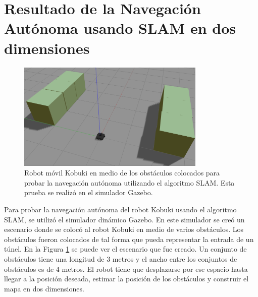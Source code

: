 \section{Resultado de la Navegación Autónoma usando SLAM en dos dimensiones}
\begin{figure}%
  \centering \footnotesize
  \includegraphics[width=0.80\textwidth]{images/kbki_ambient.png}
  \captionsetup{font=footnotesize}
  \caption{Robot móvil Kobuki en medio de los obstáculos colocados para probar la 
  navegación autónoma utilizando el algoritmo SLAM. Esta prueba se realizó en el
  simulador Gazebo.}
  \label{fig:Gazebo_simu}
\end{figure}
Para probar la navegación autónoma del robot Kobuki usando el algoritmo SLAM, se utilizó
el simulador dinámico Gazebo. En este simulador se creó un escenario donde se colocó al 
robot Kobuki en medio de varios obstáculos. Los obstáculos fueron colocados de tal forma
que pueda representar la entrada de un túnel. En la Figura \ref{fig:Gazebo_simu} se puede
ver el escenario que fue creado. Un conjunto de obstáculos tiene una longitud de 3 metros
y el ancho entre los conjuntos de obstáculos es de 4 metros. El robot tiene que desplazarse
por ese espacio hasta llegar a la posición deseada, estimar la posición de los obstáculos 
y construir el mapa en dos dimensiones.

